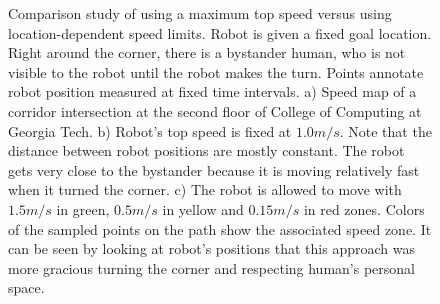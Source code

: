 \begin{figure}[ht!]
    \caption{Comparison study of using a maximum top speed versus using location-dependent speed limits. Robot is given a fixed goal location. Right around the corner, there is a bystander human, who is not visible to the robot until the robot makes the turn. Points annotate robot position measured at fixed time intervals. a) Speed map of a corridor intersection at the second floor of College of Computing at Georgia Tech. b) Robot's top speed is fixed at $1.0m/s$. Note that the distance between robot positions are mostly constant. The robot gets very close to the bystander because it is moving relatively fast when it turned the corner. c) The robot is allowed to move with $1.5m/s$ in green, $0.5m/s$ in yellow and $0.15m/s$ in red zones. Colors of the sampled points on the path show the associated speed zone. It can be seen by looking at robot's positions that this approach was more gracious turning the corner and respecting human's personal space.}
   \label{fig:nav_speed_map_results}
\end{figure}

